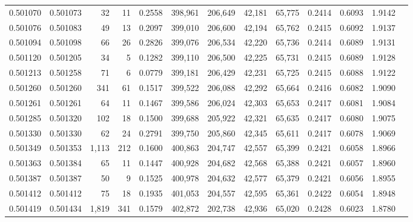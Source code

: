 \begin{tabular}{rrrrrrrrrrrrr}
0.501070 & 0.501073 &    32 &    11 &                                     0.2558 & 398,961 & 206,649 &  42,181 &  65,775 & 0.2414 & 0.6093 & 1.9142 \\
0.501076 & 0.501083 &    49 &    13 &                                     0.2097 & 399,010 & 206,600 &  42,194 &  65,762 & 0.2415 & 0.6092 & 1.9137 \\
0.501094 & 0.501098 &    66 &    26 &                                     0.2826 & 399,076 & 206,534 &  42,220 &  65,736 & 0.2414 & 0.6089 & 1.9131 \\
0.501120 & 0.501205 &    34 &     5 &                                     0.1282 & 399,110 & 206,500 &  42,225 &  65,731 & 0.2415 & 0.6089 & 1.9128 \\
0.501213 & 0.501258 &    71 &     6 &                                     0.0779 & 399,181 & 206,429 &  42,231 &  65,725 & 0.2415 & 0.6088 & 1.9122 \\
0.501260 & 0.501260 &   341 &    61 &                                     0.1517 & 399,522 & 206,088 &  42,292 &  65,664 & 0.2416 & 0.6082 & 1.9090 \\
0.501261 & 0.501261 &    64 &    11 &                                     0.1467 & 399,586 & 206,024 &  42,303 &  65,653 & 0.2417 & 0.6081 & 1.9084 \\
0.501285 & 0.501320 &   102 &    18 &                                     0.1500 & 399,688 & 205,922 &  42,321 &  65,635 & 0.2417 & 0.6080 & 1.9075 \\
0.501330 & 0.501330 &    62 &    24 &                                     0.2791 & 399,750 & 205,860 &  42,345 &  65,611 & 0.2417 & 0.6078 & 1.9069 \\
0.501349 & 0.501353 & 1,113 &   212 &                                     0.1600 & 400,863 & 204,747 &  42,557 &  65,399 & 0.2421 & 0.6058 & 1.8966 \\
0.501363 & 0.501384 &    65 &    11 &                                     0.1447 & 400,928 & 204,682 &  42,568 &  65,388 & 0.2421 & 0.6057 & 1.8960 \\
0.501387 & 0.501387 &    50 &     9 &                                     0.1525 & 400,978 & 204,632 &  42,577 &  65,379 & 0.2421 & 0.6056 & 1.8955 \\
0.501412 & 0.501412 &    75 &    18 &                                     0.1935 & 401,053 & 204,557 &  42,595 &  65,361 & 0.2422 & 0.6054 & 1.8948 \\
0.501419 & 0.501434 & 1,819 &   341 &                                     0.1579 & 402,872 & 202,738 &  42,936 &  65,020 & 0.2428 & 0.6023 & 1.8780 \\

\end{tabular}

